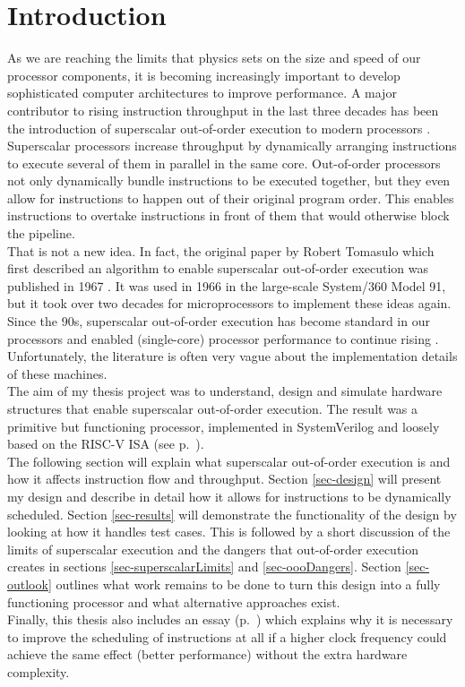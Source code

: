 \documentclass[12pt,a4paper]{article} %
\begin{document}
\section{Introduction} \label{sec-intro}
As we are reaching the limits that physics sets on the size and speed of our processor components, it is becoming increasingly important to develop sophisticated computer architectures to improve performance. A major contributor to rising instruction throughput in the last three decades has been the introduction of superscalar out-of-order execution to modern processors \cite[p.~3]{lipastiShen} \cite[p.~2f]{Hennessy}.\\ 
Superscalar processors increase throughput by dynamically arranging instructions to execute several of them in parallel in the same core. Out-of-order processors not only dynamically bundle instructions to be executed together, but they even allow for instructions to happen out of their original program order. This enables instructions to overtake instructions in front of them that would otherwise block the pipeline.\\
That is not a new idea. In fact, the original paper by Robert Tomasulo which first described an algorithm to enable superscalar out-of-order execution was published in 1967 \cite{tomasulo}. It was used in 1966 in the large-scale System/360 Model 91, but it took over two decades for microprocessors to implement these ideas again. Since the 90s, superscalar out-of-order execution has become standard in our processors and enabled (single-core) processor performance to continue rising \cite[p.~2f]{Hennessy}. Unfortunately, the literature is often very vague about the implementation details of these machines. \\
The aim of my thesis project was to understand, design and simulate hardware structures that enable superscalar out-of-order execution. The result was a primitive but functioning processor, implemented in SystemVerilog and loosely based on the RISC-V ISA (see p.~\pageref{sec-assembly}).\\

The following section will explain what superscalar out-of-order execution is and how it affects instruction flow and throughput. Section \ref{sec-design} will present my design and describe in detail how it allows for instructions to be dynamically scheduled. Section \ref{sec-results} will demonstrate the functionality of the design by looking at how it handles test cases. This is followed by a short discussion of the limits of superscalar execution and the dangers that out-of-order execution creates in sections \ref{sec-superscalarLimits} and \ref{sec-oooDangers}. Section \ref{sec-outlook} outlines what work remains to be done to turn this design into a fully functioning processor and what alternative approaches exist.\\
Finally, this thesis also includes an essay (p.~\pageref{sec-physicallimits}) which explains why it is necessary to improve the scheduling of instructions at all if a higher clock frequency could achieve the same effect (better performance) without the extra hardware complexity. 
\end{document}
